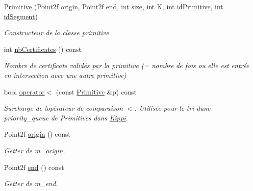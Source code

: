 \begin{DoxyCompactItemize}
\item 
\hyperlink{classPrimitive_a239074a5d2deb80546353e9b4d1cf6dc}{Primitive} (Point2f \hyperlink{classPrimitive_a4d89d749fdc58956f7ba04620cc556c4}{origin}, Point2f \hyperlink{classPrimitive_a3a3e177ac6afb1b474592993f448da22}{end}, int size, int \hyperlink{classPrimitive_a1a78dc24085b7a840f22dd66a981530b}{K}, int \hyperlink{classPrimitive_a7e4c88deefa351711897d2522333c530}{id\+Primitive}, int \hyperlink{classPrimitive_a42806c3e24a4f0e06688ee38cbfdc8e7}{id\+Segment})
\begin{DoxyCompactList}\small\item\em Constructeur de la classe primitive. \end{DoxyCompactList}\item 
\mbox{\label{classPrimitive_a9ba4d88c5e316e8112bd1fb4a0b5699c}} 
int \hyperlink{classPrimitive_a9ba4d88c5e316e8112bd1fb4a0b5699c}{nb\+Certificates} () const
\begin{DoxyCompactList}\small\item\em Nombre de certificats validés par la primitive (= nombre de fois ou elle est entrée en intersection avec une autre primitive) \end{DoxyCompactList}\item 
bool \hyperlink{classPrimitive_aef2d33af9762c7799b98f8c0cf74ee2a}{operator$<$} (const \hyperlink{classPrimitive}{Primitive} \&p) const
\begin{DoxyCompactList}\small\item\em Surcharge de l\textquotesingle{}opérateur de comparaison $<$. Utilisée pour le tri d\textquotesingle{}une priority\+\_\+queue de Primitives dans \hyperlink{classKippi}{Kippi}. \end{DoxyCompactList}\item 
Point2f \hyperlink{classPrimitive_a4d89d749fdc58956f7ba04620cc556c4}{origin} () const
\begin{DoxyCompactList}\small\item\em Getter de m\+\_\+origin. \end{DoxyCompactList}\item 
Point2f \hyperlink{classPrimitive_a3a3e177ac6afb1b474592993f448da22}{end} () const
\begin{DoxyCompactList}\small\item\em Getter de m\+\_\+end. \end{DoxyCompactList}\item 

\end{DoxyCompactItemize}

